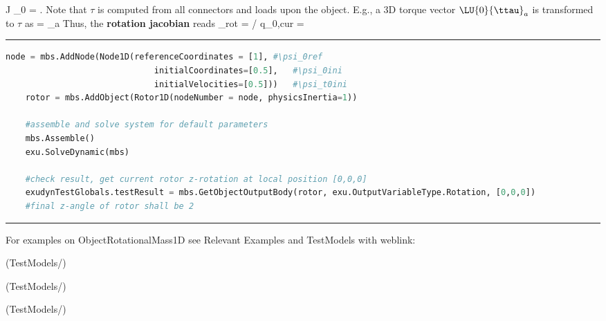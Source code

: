     \be 
      J \cdot \ddot \psi_0 = \tau.
    \ee
    Note that $\tau$ is computed from all connectors and loads upon the object. E.g., a 3D torque vector $\LU{0}{\ttau}_a$ is 
    transformed to $\tau$ as
    \be
      \tau =  _a
    \ee
    Thus, the {\bf rotation jacobian} reads 
    \be
      \Jm_{rot} = \partial \tomega\cCur / \partial \dot q_{0,cur} = 
        
    \ee
\vspace{6pt}\par\noindent\rule{\textwidth}{0.4pt}
\label{miniExample_ObjectRotationalMass1D}
\pythonstyle
\begin{lstlisting}[language=Python, firstnumber=1]
    node = mbs.AddNode(Node1D(referenceCoordinates = [1], #\psi_0ref
                              initialCoordinates=[0.5],   #\psi_0ini
                              initialVelocities=[0.5]))   #\psi_t0ini
    rotor = mbs.AddObject(Rotor1D(nodeNumber = node, physicsInertia=1))

    #assemble and solve system for default parameters
    mbs.Assemble()
    exu.SolveDynamic(mbs)

    #check result, get current rotor z-rotation at local position [0,0,0]
    exudynTestGlobals.testResult = mbs.GetObjectOutputBody(rotor, exu.OutputVariableType.Rotation, [0,0,0])
    #final z-angle of rotor shall be 2

\end{lstlisting}

\vspace{6pt}\par\noindent\rule{\textwidth}{0.4pt}
%
\noindent For examples on ObjectRotationalMass1D see Relevant Examples and TestModels with weblink:
\bi
\item {} (TestModels/)
\item {} (TestModels/)
\item {} (TestModels/)

\ei

%
\newpage

